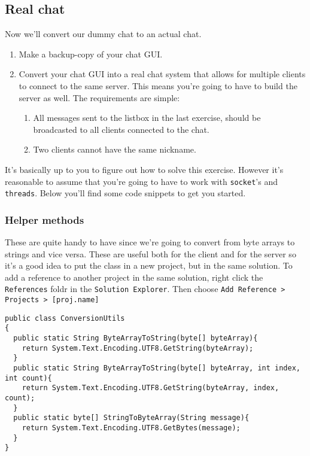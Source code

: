 \documentclass{article}
\newcounter{stepcounter}
\newenvironment{steps}{ 
  \begin{enumerate}[label=\color{red}Step \theenumi)]
    \setcounter{enumi}{\value{stepcounter}}
}{
  \setcounter{stepcounter}{\value{enumi}}
  \end{enumerate}
}
\begin{document}
\subsection{Real chat}
Now we'll convert our dummy chat to an actual chat.
\begin{steps}
\item Make a backup-copy of your chat GUI.
\item Convert your chat GUI into a real chat system that allows for multiple clients to connect to the same server. This means you're going to have to build the server as well. The requirements are simple:
  \begin{enumerate}
    \item All messages sent to the listbox in the last exercise, should be broadcasted to all clients connected to the chat. 
    \item Two clients cannot have the same nickname.
  \end{enumerate}
\end{steps}
It's basically up to you to figure out how to solve this exercise. However it's reasonable to assume that you're going to have to work with \texttt{socket}'s and \texttt{threads}. Below you'll find some code snippets to get you started.

\subsubsection{Helper methods}
These are quite handy to have since we're going to convert from byte arrays to strings and vice versa. These are useful both for the client and for the server so it's a good idea to put the class in a new project, but in the same solution. To add a reference to another project in the same solution, right click the \texttt{References} foldr in the \texttt{Solution Explorer}. Then choose \texttt{Add Reference > Projects > [proj.name]}
\begin{lstlisting}
public class ConversionUtils
{
  public static String ByteArrayToString(byte[] byteArray){
    return System.Text.Encoding.UTF8.GetString(byteArray);
  }
  public static String ByteArrayToString(byte[] byteArray, int index, int count){
    return System.Text.Encoding.UTF8.GetString(byteArray, index, count);
  }
  public static byte[] StringToByteArray(String message){
    return System.Text.Encoding.UTF8.GetBytes(message);
  } 
}
\end{lstlisting}
\end{document}
